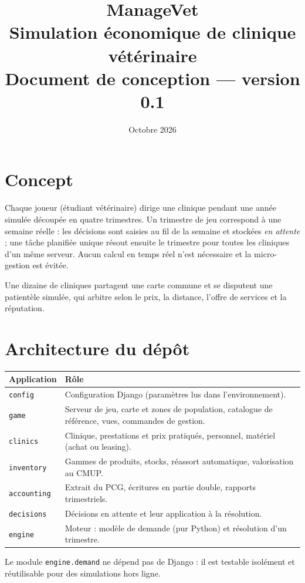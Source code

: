 \documentclass[11pt,a4paper]{article}
\title{ManageVet\\[0.3em]\large Simulation économique de clinique vétérinaire\\Document de conception --- version 0.1}
\author{}
\date{Octobre 2026}
\newcommand{\code}[1]{\texttt{#1}}
\begin{document}
\maketitle
\tableofcontents

\section{Concept}

Chaque joueur (étudiant vétérinaire) dirige une clinique pendant une année
simulée découpée en quatre trimestres. Un trimestre de jeu correspond à une
semaine réelle : les décisions sont saisies au fil de la semaine et stockées
\emph{en attente} ; une tâche planifiée unique résout ensuite le trimestre
pour toutes les cliniques d'un même serveur. Aucun calcul en temps réel n'est
nécessaire et la micro-gestion est évitée.

Une dizaine de cliniques partagent une carte commune et se disputent une
patientèle simulée, qui arbitre selon le prix, la distance, l'offre de
services et la réputation.

\section{Architecture du dépôt}

\begin{tabularx}{\textwidth}{@{}lX@{}}
\toprule
Application & Rôle \\
\midrule
\code{config} & Configuration Django (paramètres lus dans l'environnement). \\
\code{game} & Serveur de jeu, carte et zones de population, catalogue de référence, vues, commandes de gestion. \\
\code{clinics} & Clinique, prestations et prix pratiqués, personnel, matériel (achat ou leasing). \\
\code{inventory} & Gammes de produits, stocks, réassort automatique, valorisation au CMUP. \\
\code{accounting} & Extrait du PCG, écritures en partie double, rapports trimestriels. \\
\code{decisions} & Décisions en attente et leur application à la résolution. \\
\code{engine} & Moteur : modèle de demande (pur Python) et résolution d'un trimestre. \\
\bottomrule
\end{tabularx}

\medskip
Le module \code{engine.demand} ne dépend pas de Django : il est testable
isolément et réutilisable pour des simulations hors ligne.
\end{document}
